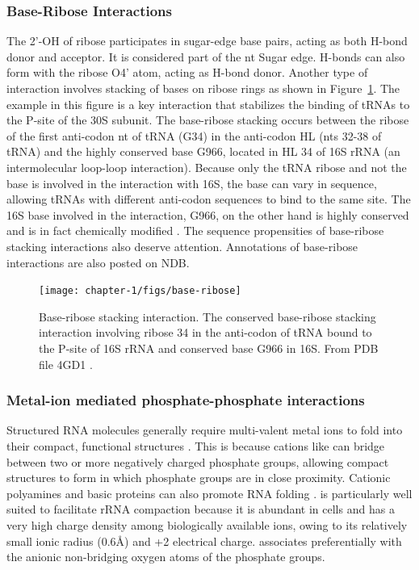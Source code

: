 \subsubsection{Base-Ribose Interactions}

The 2'-OH of ribose participates in sugar-edge base pairs, acting as both H-bond
donor and acceptor. It is considered part of the nt Sugar edge. H-bonds can also
form with the ribose O4' atom, acting as H-bond donor. Another type of
interaction involves stacking of bases on ribose rings as shown in
Figure~\ref{fig:base-ribose}. The example in this figure is a key interaction
that stabilizes the binding of tRNAs to the P-site of the 30S subunit. The
base-ribose stacking occurs between the ribose of the first anti-codon nt of
tRNA (G34) in the anti-codon HL (nts 32-38 of tRNA) and the highly conserved
base G966, located in HL 34 of 16S rRNA (an intermolecular loop-loop
interaction). Because only the tRNA ribose and not the base is involved in the
interaction with 16S, the base can vary in sequence, allowing tRNAs with
different anti-codon sequences to bind to the same site. The 16S base involved
in the interaction, G966, on the other hand is highly conserved and is in fact
chemically modified \cite{Burakovsky2012}. The sequence propensities of
base-ribose stacking interactions also deserve attention. Annotations of
base-ribose interactions are also posted on NDB.

\begin{figure}
  \texttt{[image: chapter-1/figs/base-ribose]}
  \caption{Base-ribose stacking interaction. The conserved base-ribose stacking
    interaction involving ribose 34 in the anti-codon of tRNA bound to the
    P-site of 16S rRNA and conserved base G966 in 16S.  From PDB file 4GD1
    \cite{Dunkle2011a}.}
  \label{fig:base-ribose}
\end{figure}

\subsubsection{Metal-ion mediated phosphate-phosphate interactions}

Structured RNA molecules generally require multi-valent metal ions to fold into
their compact, functional structures \cite{Woodson2005, Bowman2012, Draper2005,
Draper2013, Auffinger2011, Tan2011}. This is because cations like  can
bridge between two or more negatively charged phosphate groups, allowing compact
structures to form in which phosphate groups are in close proximity. Cationic
polyamines and basic proteins can also promote RNA folding \cite{Klein2004a,
Koculi2006}.  is particularly well suited to facilitate rRNA compaction
because it is abundant in cells and has a very high charge density among
biologically available ions, owing to its relatively small ionic radius (0.6\AA)
and +2 electrical charge.  associates preferentially with the anionic
non-bridging oxygen atoms of the phosphate groups. 


